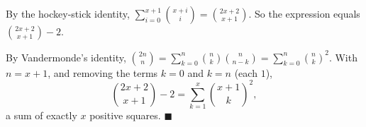 By the hockey-stick identity, $\displaystyle\sum_{i=0}^{x+1}\binom{x+i}{i}=\binom{2x+2}{x+1}$. So the expression equals $\binom{2x+2}{x+1}-2$.

By Vandermonde's identity, $\binom{2n}{n}=\sum_{k=0}^{n}\binom nk\binom n{n-k}=\sum_{k=0}^n\binom nk^2$. With $n=x+1$, and removing the terms $k=0$ and $k=n$ (each $1$),
\[\binom{2x+2}{x+1}-2=\sum_{k=1}^{x}\binom{x+1}{k}^2,\]
a sum of exactly $x$ positive squares. $\blacksquare$
